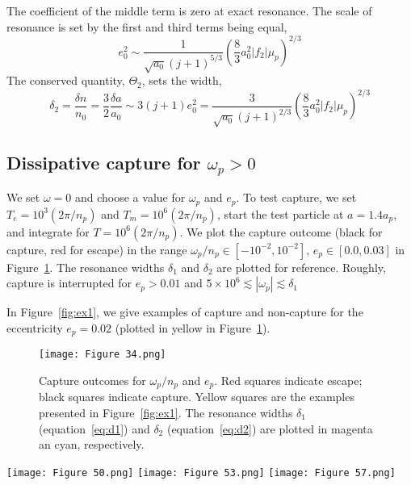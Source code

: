 \documentclass{article}
\begin{document}
The coefficient of the middle term is zero at exact resonance.
The scale of resonance is set by the first and third terms being equal,
\begin{equation}
    e_0^2 \sim\frac{1}{\sqrt{a_0}(j+1)^{5/3}} \left(\frac83 a_0^2|f_2|\mu_p\right)^{2/3}
\end{equation}
The conserved quantity, $\Theta_2$, sets the width,
\begin{equation}\label{eq:d2}
    \delta_2 = \frac{\delta n}{n_0} = \frac32\frac{\delta a}{a_0} \sim 3(j+1)e_0^2
    = \frac{3}{\sqrt{a_0}(j+1)^{2/3}}\left(\frac83 a_0^2 |f_2|\mu_p\right)^{2/3}
\end{equation}

\subsection{Dissipative capture for $\omega_p>0$}
We set $\omega=0$ and choose a value for $\omega_p$ and $e_p$.
To test capture, we set $T_e=10^{3} (2\pi/n_p)$ and $T_m=10^{6} (2\pi/n_p)$, start the test particle at $a=1.4 a_p$, and integrate for $T=10^6(2\pi/n_p)$.
We plot the capture outcome (black for capture, red for escape) in the range $\omega_p/n_p \in [-10^{-2},10^{-2}]$, $e_p\in [0.0,0.03]$ in Figure~\ref{fig:grid}.
The resonance widths $\delta_1$ and $\delta_2$ are plotted for reference.
Roughly, capture is interrupted for $e_p>0.01$ and $5\times10^{6}\lesssim|\omega_p|\lesssim\delta_1$

In Figure~\ref{fig:ex1}, we give examples of capture and non-capture for the eccentricity $e_p=0.02$ (plotted in yellow in Figure~\ref{fig:grid}).

\begin{figure}
    \centering
    \texttt{[image: Figure 34.png]}
    \caption{Capture outcomes for $\omega_p/n_p$ and $e_p$. Red squares indicate escape; black squares indicate capture. Yellow squares are the examples presented in Figure~\ref{fig:ex1}. The resonance widths $\delta_1$ (equation~\ref{eq:d1}) and $\delta_2$ (equation~\ref{eq:d2}) are plotted in magenta an cyan, respectively.}
    \label{fig:grid}
\end{figure}
\begin{figure*}
    \centering
    \texttt{[image: Figure 50.png]}
    \texttt{[image: Figure 53.png]}
    \texttt{[image: Figure 57.png]}
    \caption{
        \textit{Left:} Capture for $\omega_p/n_p=2.68\times10^{-6}$. The precession frequency is not large enough for resonance interference.
        \textit{Middle:} Escape for $\omega_p/n_p=1.39\times10^{-4}$. Eccentricity is excited near resonance but then the planet passes through the resonance.
        \textit{Right:} Capture for $\omega_p/n_p =3.73\times10^{-3}$. The precession frequency is large enough so that the resonances are well separated.
    }
    \label{fig:ex1}
\end{figure*}
\end{document}
